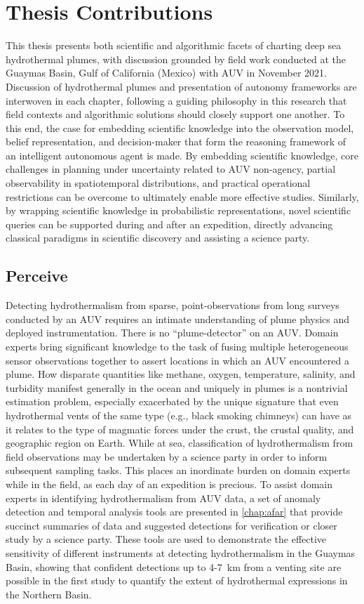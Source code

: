 \section{Thesis Contributions}
\label{sec:intro_contributions}
This thesis presents both scientific and algorithmic facets of charting deep sea hydrothermal plumes, with discussion grounded by field work conducted at the Guaymas Basin, Gulf of California (Mexico) with AUV \Sentry in November 2021.
Discussion of hydrothermal plumes and presentation of autonomy frameworks are interwoven in each chapter, following a guiding philosophy in this research that field contexts and algorithmic solutions should closely support one another.
To this end, the case for embedding scientific knowledge into the observation model, belief representation, and decision-maker that form the reasoning framework of an intelligent autonomous agent is made.
By embedding scientific knowledge, core challenges in planning under uncertainty related to AUV non-agency, partial observability in spatiotemporal distributions, and practical operational restrictions can be overcome to ultimately enable more effective studies. 
Similarly, by wrapping scientific knowledge in probabilistic representations, novel scientific queries can be supported during and after an expedition, directly advancing classical paradigms in scientific discovery and assisting a science party.

\subsection{Perceive}
Detecting hydrothermalism from sparse, point-observations from long surveys conducted by an AUV requires an intimate understanding of plume physics and deployed instrumentation.
There is no ``plume-detector'' on an AUV.
Domain experts bring significant knowledge to the task of fusing multiple heterogeneous sensor observations together to assert locations in which an AUV encountered a plume.
How disparate quantities like methane, oxygen, temperature, salinity, and turbidity manifest generally in the ocean and uniquely in plumes is a nontrivial estimation problem, especially exacerbated by the unique signature that even hydrothermal vents of the same type (e.g., black smoking chimneys) can have as it relates to the type of magmatic forces under the crust, the crustal quality, and geographic region on Earth.
While at sea, classification of hydrothermalism from field observations may be undertaken by a science party in order to inform subsequent sampling tasks. 
This places an inordinate burden on domain experts while in the field, as each day of an expedition is precious. 
To assist domain experts in identifying hydrothermalism from AUV data, a set of anomaly detection and temporal analysis tools are presented in \cref{chap:afar} that provide succinct summaries of data and suggested detections for verification or closer study by a science party.
These tools are used to demonstrate the effective sensitivity of different instruments at detecting hydrothermalism in the Guaymas Basin, showing that confident detections up to 4-\SI{7}{\kilo\meter} from a venting site are possible in the first study to quantify the extent of hydrothermal expressions in the Northern Basin.

